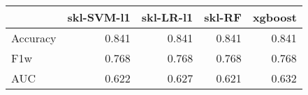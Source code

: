 \begin{tabular}{lrrrr}
\toprule
{} &  skl-SVM-l1 &  skl-LR-l1 &  skl-RF &  xgboost \\
\midrule
Accuracy &       0.841 &      0.841 &   0.841 &    0.841 \\
F1w      &       0.768 &      0.768 &   0.768 &    0.768 \\
AUC      &       0.622 &      0.627 &   0.621 &    0.632 \\
\bottomrule
\end{tabular}
